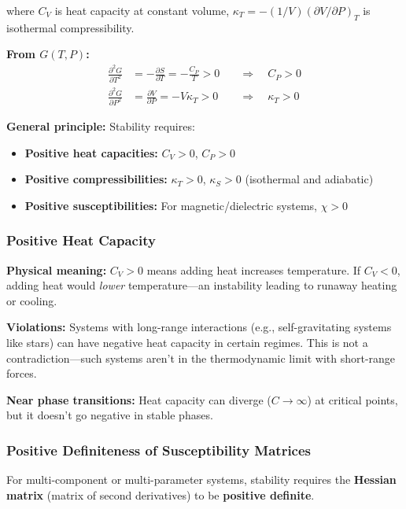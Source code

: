 \documentclass[9pt,twocoloumn]{article}
\begin{document}
where $C_V$ is heat capacity at constant volume, $\kappa_T = -(1/V)(\partial V/\partial P)_T$ is isothermal compressibility.

\textbf{From $G(T, P)$:}
\begin{align}
\frac{\partial^2 G}{\partial T^2} &= -\frac{\partial S}{\partial T} = -\frac{C_P}{T} > 0 \quad &\Rightarrow \quad \boxed{C_P > 0} \\
\frac{\partial^2 G}{\partial P^2} &= \frac{\partial V}{\partial P} = -V\kappa_T > 0 \quad &\Rightarrow \quad \boxed{\kappa_T > 0}
\end{align}

\textbf{General principle:} Stability requires:
\begin{itemize}
    \item \textbf{Positive heat capacities:} $C_V > 0$, $C_P > 0$
    \item \textbf{Positive compressibilities:} $\kappa_T > 0$, $\kappa_S > 0$ (isothermal and adiabatic)
    \item \textbf{Positive susceptibilities:} For magnetic/dielectric systems, $\chi > 0$
\end{itemize}

\subsubsection{Positive Heat Capacity}

\textbf{Physical meaning:} $C_V > 0$ means adding heat increases temperature. If $C_V < 0$, adding heat would \emph{lower} temperature—an instability leading to runaway heating or cooling.

\textbf{Violations:} Systems with long-range interactions (e.g., self-gravitating systems like stars) can have negative heat capacity in certain regimes. This is not a contradiction—such systems aren't in the thermodynamic limit with short-range forces.

\textbf{Near phase transitions:} Heat capacity can diverge ($C \to \infty$) at critical points, but it doesn't go negative in stable phases.

\subsubsection{Positive Definiteness of Susceptibility Matrices}

For multi-component or multi-parameter systems, stability requires the \textbf{Hessian matrix} (matrix of second derivatives) to be \textbf{positive definite}.
\end{document}
